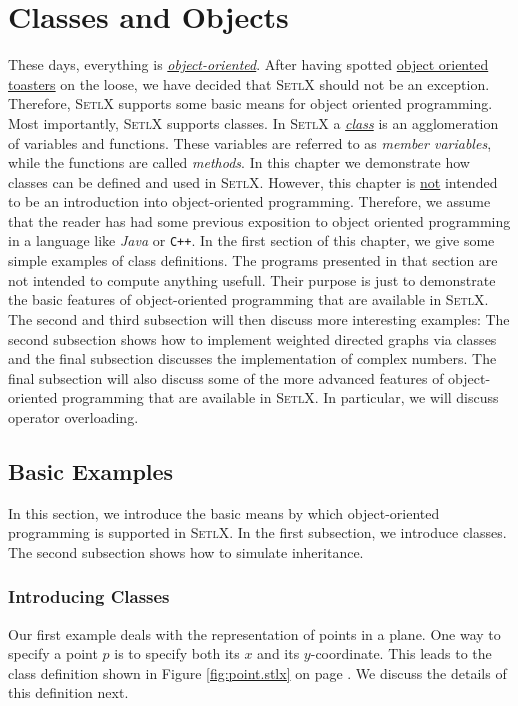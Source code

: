 \chapter{Classes and Objects}
These days, everything is
\href{http://en.wikipedia.org/wiki/Object-oriented_programming}{\emph{object-oriented}}.  
After having spotted
\href{http://www.danielsen.com/jokes/objecttoaster.txt}{object oriented toasters}  
on the loose, we have decided that \textsc{SetlX} should not be an exception.  Therefore,
\textsc{SetlX} supports some basic means for object oriented programming.  Most importantly,
\textsc{SetlX} supports classes.  In \textsc{SetlX} a  
\href{http://en.wikipedia.org/wiki/Class_(computer_programming)}{\emph{class}}
is an agglomeration of variables and functions.  These variables are referred to as 
\emph{member variables}, while the functions are called \emph{methods}.  
In this chapter we demonstrate how classes can be defined and used in \textsc{SetlX}.  
However, this chapter is \underline{not} intended to be an introduction into object-oriented
programming.  Therefore,  we assume that the reader 
has had some previous exposition to object oriented programming in a language like \textsl{Java} or
\texttt{C++}.   In the first section of this chapter, we give some simple examples of class definitions.
The programs presented in that section are not intended to compute anything usefull.  Their
purpose is just to demonstrate the basic features of object-oriented programming that are available
in \textsc{SetlX}.  The second  and third subsection will then discuss more interesting examples:
The second subsection shows how to implement weighted directed graphs via classes and the final
subsection discusses the implementation of complex numbers.  The final subsection will also discuss
some of the more advanced features of object-oriented programming that are available in
\textsc{SetlX}.  In particular, we will discuss operator overloading.

\section{Basic Examples}
In this section, we introduce the basic means by which object-oriented programming is supported in
\textsc{SetlX}.  In the first subsection, we introduce classes.  The second subsection shows how to
simulate inheritance.

\subsection{Introducing Classes}
Our first example deals with the representation of points in a plane.  One way to specify a point
$p$ is to specify both its $x$ and its $y$-coordinate.  This leads to the class definition shown in
Figure \ref{fig:point.stlx} on page \pageref{fig:point.stlx}.  We discuss the details of this
definition next.

